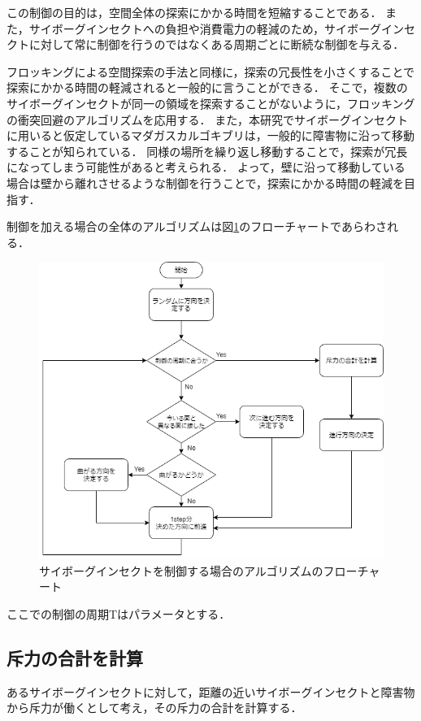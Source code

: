 \documentclass[a4paper,11pt]{jarticle}
\begin{document}
	この制御の目的は，空間全体の探索にかかる時間を短縮することである．
	また，サイボーグインセクトへの負担や消費電力の軽減のため，サイボーグインセクトに対して常に制御を行うのではなくある周期ごとに断続な制御を与える．
	
	フロッキングによる空間探索の手法\cite{}と同様に，探索の冗長性を小さくすることで探索にかかる時間の軽減されると一般的に言うことができる．
	そこで，複数のサイボーグインセクトが同一の領域を探索することがないように，フロッキングの衝突回避のアルゴリズムを応用する．
	また，本研究でサイボーグインセクトに用いると仮定しているマダガスカルゴキブリは，一般的に障害物に沿って移動することが知られている．
	同様の場所を繰り返し移動することで，探索が冗長になってしまう可能性があると考えられる．
	よって，壁に沿って移動している場合は壁から離れさせるような制御を行うことで，探索にかかる時間の軽減を目指す．
	
	制御を加える場合の全体のアルゴリズムは図\ref{fig:control}のフローチャートであらわされる．
	
	\begin{figure}
		\centering
		\includegraphics[width=0.8\linewidth]{png/control.png}
		\caption[アルゴリズムのフローチャート]{サイボーグインセクトを制御する場合のアルゴリズムのフローチャート}
		\label{fig:control}
	\end{figure}
	ここでの制御の周期Tはパラメータとする．
	
	\subsection{斥力の合計を計算}
	\label{sec:repulsive}
	あるサイボーグインセクトに対して，距離の近いサイボーグインセクトと障害物から斥力が働くとして考え，その斥力の合計を計算する\cite{flocking-robot}．
	
\end{document}
